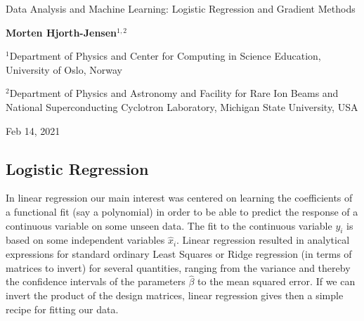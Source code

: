 \documentclass[%
oneside,                 %
final,                   %
10pt]{article}
\begin{document}

\newcommand{\exercisesection}[1]{\subsection*{#1}}






\thispagestyle{empty}

\begin{center}
{\LARGE\bf
\begin{spacing}{1.25}
Data Analysis and Machine Learning: Logistic Regression and Gradient Methods
\end{spacing}
}
\end{center}


\begin{center}
{\bf Morten Hjorth-Jensen${}^{1, 2}$} \\ [0mm]
\end{center}

\begin{center}
\centerline{{\small ${}^1$Department of Physics and Center for Computing in Science Education, University of Oslo, Norway}}
\centerline{{\small ${}^2$Department of Physics and Astronomy and Facility for Rare Ion Beams and National Superconducting Cyclotron Laboratory, Michigan State University, USA}}
\end{center}
    

\begin{center}
Feb 14, 2021
\end{center}

\vspace{1cm}


\subsection{Logistic Regression}

In linear regression our main interest was centered on learning the
coefficients of a functional fit (say a polynomial) in order to be
able to predict the response of a continuous variable on some unseen
data. The fit to the continuous variable $y_i$ is based on some
independent variables $\hat{x}_i$. Linear regression resulted in
analytical expressions for standard ordinary Least Squares or Ridge
regression (in terms of matrices to invert) for several quantities,
ranging from the variance and thereby the confidence intervals of the
parameters $\hat{\beta}$ to the mean squared error. If we can invert
the product of the design matrices, linear regression gives then a
simple recipe for fitting our data.
\end{document}
